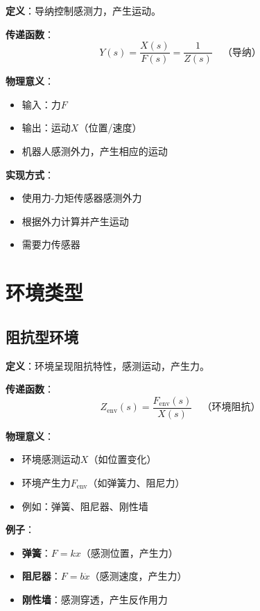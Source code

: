 \documentclass[12pt,a4paper]{article}
\begin{document}
\textbf{定义}：导纳控制感测力，产生运动。

\textbf{传递函数}：
\begin{equation}
Y(s) = \frac{X(s)}{F(s)} = \frac{1}{Z(s)} \quad \text{（导纳）}
\end{equation}

\textbf{物理意义}：
\begin{itemize}
\item 输入：力$F$
\item 输出：运动$X$（位置/速度）
\item 机器人感测外力，产生相应的运动
\end{itemize}

\textbf{实现方式}：
\begin{itemize}
\item 使用力-力矩传感器感测外力
\item 根据外力计算并产生运动
\item 需要力传感器
\end{itemize}

\section{环境类型}

\subsection{阻抗型环境}

\textbf{定义}：环境呈现阻抗特性，感测运动，产生力。

\textbf{传递函数}：
\begin{equation}
Z_{\text{env}}(s) = \frac{F_{\text{env}}(s)}{X(s)} \quad \text{（环境阻抗）}
\end{equation}

\textbf{物理意义}：
\begin{itemize}
\item 环境感测运动$X$（如位置变化）
\item 环境产生力$F_{\text{env}}$（如弹簧力、阻尼力）
\item 例如：弹簧、阻尼器、刚性墙
\end{itemize}

\textbf{例子}：
\begin{itemize}
\item \textbf{弹簧}：$F = kx$（感测位置，产生力）
\item \textbf{阻尼器}：$F = b\dot{x}$（感测速度，产生力）
\item \textbf{刚性墙}：感测穿透，产生反作用力
\end{itemize}
\end{document}
